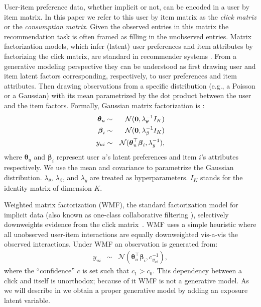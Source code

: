  User-item preference
data, whether implicit or not, can be encoded in a user by item matrix.
In this paper we refer to this user by item matrix as the \emph{click
matrix} or the \emph{consumption matrix}. Given the observed entries in this matrix
the recommendation task is often framed as filling in the unobserved
entries.  Matrix factorization models, which infer (latent) user
preferences and item attributes by factorizing the click matrix, are standard in recommender
systems \cite{koren2009matrix}. From a generative modeling perspective they
can be understood as first drawing user and item latent factors corresponding,
respectively, to user preferences and item attributes. Then drawing 
observations from a specific distribution (e.g., a Poisson
or a Gaussian) with its mean parametrized by the dot product between the user and
the item factors. Formally, Gaussian matrix factorization is \cite{mnih2007probabilistic}: 
\begin{eqnarray} %
	\boldsymbol\theta_{u} &\sim& \mathcal{N}(\bzero, \lambda_\theta^{-1} I_K) \nonumber \\
	\boldsymbol\beta_{i} &\sim& \mathcal{N}(\bzero, \lambda_\beta^{-1} I_K)  \nonumber \\
	y_{ui} &\sim& \mathcal{N}(\boldsymbol\theta_u^\top \boldsymbol\beta_i, \lambda_y^{-1}), \nonumber 
 \end{eqnarray}
where $\boldsymbol\theta_u$ and $\boldsymbol\beta_i$ represent user $u$'s latent preferences and
item $i$'s attributes respectively. We use the mean and covariance to
parametrize the Gaussian distribution. $\lambda_\theta$, $\lambda_\beta$, and
$\lambda_y$ are treated as hyperparameters. $I_K$ stands for the identity
matrix of dimension $K$. 

 Weighted
matrix factorization (WMF), the standard factorization model for implicit
data (also known as one-class collaborative filtering \cite{pan2008one}), selectively downweights evidence from the click
matrix~\cite{hu2008collaborative}.  WMF uses a simple heuristic where all
unobserved user-item interactions are equally downweighted vis-a-vis the
observed interactions. Under WMF an observation is generated from:
\begin{eqnarray} 
y_{ui} &\sim& \mathcal{N}(\boldsymbol\theta_u^\top\boldsymbol\beta_i, c^{-1}_{y_{ui}}), \nonumber
\end{eqnarray}
where the ``confidence'' $c$ is set such that $c_1 > c_0$. This dependency between a
click and itself is unorthodox; because of it WMF is not a generative
model. As we will describe in  we obtain a proper generative
model by adding an exposure latent variable. 

